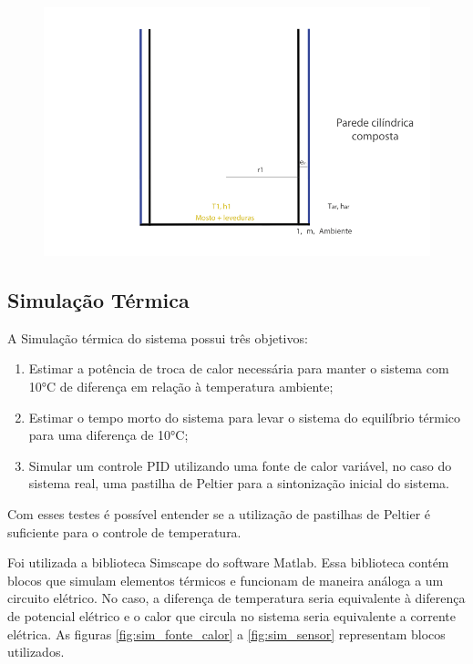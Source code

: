 \begin{figure}[h]
    \centering
    \includegraphics[scale=0.45]{figuras/projeto/controle/fermentador_controle.png}
    \label{fig:fermentador_controle}
\end{figure}



\subsection{Simulação Térmica}

A Simulação térmica do sistema possui três objetivos:

\begin{enumerate}
    \item Estimar a potência de troca de calor necessária para manter o sistema com 10°C de diferença em relação à temperatura ambiente;
    \item Estimar o tempo morto do sistema para levar o sistema do equilíbrio térmico para uma diferença de 10°C;
    \item Simular um controle PID utilizando uma fonte de calor variável, no caso do sistema real, uma pastilha de Peltier para a sintonização inicial do sistema.
\end{enumerate}

Com esses testes é possível entender se a utilização de pastilhas de Peltier é suficiente para o controle de temperatura.


Foi utilizada a biblioteca Simscape do software Matlab. Essa biblioteca contém blocos que simulam elementos térmicos e funcionam de maneira análoga a um circuito elétrico. No caso, a diferença de temperatura seria equivalente à diferença de potencial elétrico e o calor que circula no sistema seria equivalente a corrente elétrica. As figuras \ref{fig:sim_fonte_calor} a \ref{fig:sim_sensor} representam blocos utilizados.


